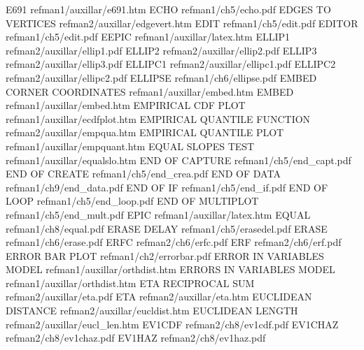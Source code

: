 E691                                    refman1/auxillar/e691.htm
ECHO                                    refman1/ch5/echo.pdf
EDGES TO VERTICES                       refman2/auxillar/edgevert.htm
EDIT                                    refman1/ch5/edit.pdf
EDITOR                                  refman1/ch5/edit.pdf
EEPIC                                   refman1/auxillar/latex.htm
ELLIP1                                  refman2/auxillar/ellip1.pdf
ELLIP2                                  refman2/auxillar/ellip2.pdf
ELLIP3                                  refman2/auxillar/ellip3.pdf
ELLIPC1                                 refman2/auxillar/ellipc1.pdf
ELLIPC2                                 refman2/auxillar/ellipc2.pdf
ELLIPSE                                 refman1/ch6/ellipse.pdf
EMBED CORNER COORDINATES                refman1/auxillar/embed.htm
EMBED                                   refman1/auxillar/embed.htm
EMPIRICAL CDF PLOT                      refman1/auxillar/ecdfplot.htm
EMPIRICAL QUANTILE FUNCTION             refman2/auxillar/empqua.htm
EMPIRICAL QUANTILE PLOT                 refman1/auxillar/empquant.htm
EQUAL SLOPES TEST                       refman1/auxillar/equalslo.htm
END OF CAPTURE                          refman1/ch5/end_capt.pdf
END OF CREATE                           refman1/ch5/end_crea.pdf
END OF DATA                             refman1/ch9/end_data.pdf
END OF IF                               refman1/ch5/end_if.pdf
END OF LOOP                             refman1/ch5/end_loop.pdf
END OF MULTIPLOT                        refman1/ch5/end_mult.pdf
EPIC                                    refman1/auxillar/latex.htm
EQUAL                                   refman1/ch8/equal.pdf
ERASE DELAY                             refman1/ch5/erasedel.pdf
ERASE                                   refman1/ch6/erase.pdf
ERFC                                    refman2/ch6/erfc.pdf
ERF                                     refman2/ch6/erf.pdf
ERROR BAR PLOT                          refman1/ch2/errorbar.pdf
ERROR IN VARIABLES MODEL                refman1/auxillar/orthdist.htm
ERRORS IN VARIABLES MODEL               refman1/auxillar/orthdist.htm
ETA RECIPROCAL SUM                      refman2/auxillar/eta.pdf
ETA                                     refman2/auxillar/eta.htm
EUCLIDEAN DISTANCE                      refman2/auxillar/eucldist.htm
EUCLIDEAN LENGTH                        refman2/auxillar/eucl_len.htm
EV1CDF                                  refman2/ch8/ev1cdf.pdf
EV1CHAZ                                 refman2/ch8/ev1chaz.pdf
EV1HAZ                                  refman2/ch8/ev1haz.pdf
